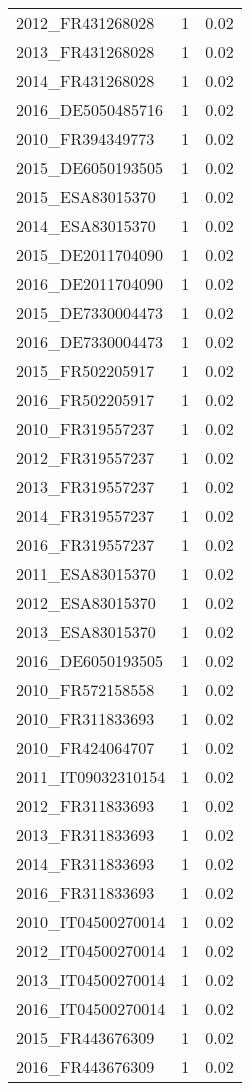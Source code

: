 \begin{table*}[htbp]
\begin{tabular}{lrr}
2012_FR431268028 & 1 & 0.02 \\
2013_FR431268028 & 1 & 0.02 \\
2014_FR431268028 & 1 & 0.02 \\
2016_DE5050485716 & 1 & 0.02 \\
2010_FR394349773 & 1 & 0.02 \\
2015_DE6050193505 & 1 & 0.02 \\
2015_ESA83015370 & 1 & 0.02 \\
2014_ESA83015370 & 1 & 0.02 \\
2015_DE2011704090 & 1 & 0.02 \\
2016_DE2011704090 & 1 & 0.02 \\
2015_DE7330004473 & 1 & 0.02 \\
2016_DE7330004473 & 1 & 0.02 \\
2015_FR502205917 & 1 & 0.02 \\
2016_FR502205917 & 1 & 0.02 \\
2010_FR319557237 & 1 & 0.02 \\
2012_FR319557237 & 1 & 0.02 \\
2013_FR319557237 & 1 & 0.02 \\
2014_FR319557237 & 1 & 0.02 \\
2016_FR319557237 & 1 & 0.02 \\
2011_ESA83015370 & 1 & 0.02 \\
2012_ESA83015370 & 1 & 0.02 \\
2013_ESA83015370 & 1 & 0.02 \\
2016_DE6050193505 & 1 & 0.02 \\
2010_FR572158558 & 1 & 0.02 \\
2010_FR311833693 & 1 & 0.02 \\
2010_FR424064707 & 1 & 0.02 \\
2011_IT09032310154 & 1 & 0.02 \\
2012_FR311833693 & 1 & 0.02 \\
2013_FR311833693 & 1 & 0.02 \\
2014_FR311833693 & 1 & 0.02 \\
2016_FR311833693 & 1 & 0.02 \\
2010_IT04500270014 & 1 & 0.02 \\
2012_IT04500270014 & 1 & 0.02 \\
2013_IT04500270014 & 1 & 0.02 \\
2016_IT04500270014 & 1 & 0.02 \\
2015_FR443676309 & 1 & 0.02 \\
2016_FR443676309 & 1 & 0.02 \\

\end{tabular}
\end{table*}
